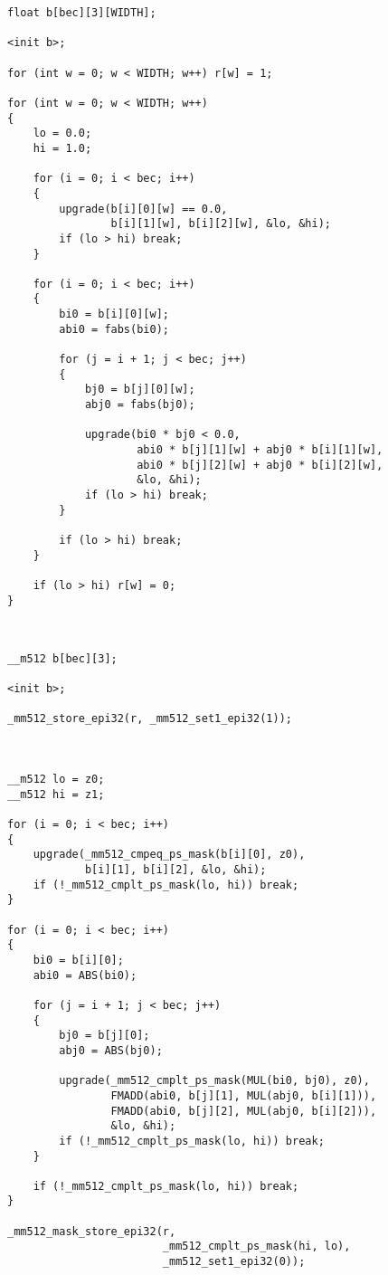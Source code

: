 \documentclass[
11pt,%
tightenlines,%
twoside,%
onecolumn,%
nofloats,%
nobibnotes,%
nofootinbib,%
superscriptaddress,%
noshowpacs,%
centertags]%
{revtex4}
\begin{document}
\begin{lstlisting}[caption={Scheme of program code before conversion to vector form.},label={lst:prac_inter_pred}]
float b[bec][3][WIDTH];

<init b>;

for (int w = 0; w < WIDTH; w++) r[w] = 1;

for (int w = 0; w < WIDTH; w++)
{
    lo = 0.0;
    hi = 1.0;

    for (i = 0; i < bec; i++)
    {
        upgrade(b[i][0][w] == 0.0,
                b[i][1][w], b[i][2][w], &lo, &hi);
        if (lo > hi) break;
    }

    for (i = 0; i < bec; i++)
    {
        bi0 = b[i][0][w];
        abi0 = fabs(bi0);

        for (j = i + 1; j < bec; j++)
        {
            bj0 = b[j][0][w];
            abj0 = fabs(bj0);

            upgrade(bi0 * bj0 < 0.0,
                    abi0 * b[j][1][w] + abj0 * b[i][1][w],
                    abi0 * b[j][2][w] + abj0 * b[i][2][w],
                    &lo, &hi);
            if (lo > hi) break;
        }

        if (lo > hi) break;
    }

    if (lo > hi) r[w] = 0;
}
\end{lstlisting}

\ \\

\begin{lstlisting}[caption={Vector form of the resulting code from listing \ref{lst:prac_inter_pred}.},label={lst:prac_inter_vec}]
__m512 b[bec][3];

<init b>;

_mm512_store_epi32(r, _mm512_set1_epi32(1));



__m512 lo = z0;
__m512 hi = z1;

for (i = 0; i < bec; i++)
{
    upgrade(_mm512_cmpeq_ps_mask(b[i][0], z0),
            b[i][1], b[i][2], &lo, &hi);
    if (!_mm512_cmplt_ps_mask(lo, hi)) break;
}

for (i = 0; i < bec; i++)
{
    bi0 = b[i][0];
    abi0 = ABS(bi0);

    for (j = i + 1; j < bec; j++)
    {
        bj0 = b[j][0];
        abj0 = ABS(bj0);

        upgrade(_mm512_cmplt_ps_mask(MUL(bi0, bj0), z0),
                FMADD(abi0, b[j][1], MUL(abj0, b[i][1])),
                FMADD(abi0, b[j][2], MUL(abj0, b[i][2])),
                &lo, &hi);
        if (!_mm512_cmplt_ps_mask(lo, hi)) break;
    }

    if (!_mm512_cmplt_ps_mask(lo, hi)) break;
}

_mm512_mask_store_epi32(r,
                        _mm512_cmplt_ps_mask(hi, lo),
                        _mm512_set1_epi32(0));
\end{lstlisting}
\end{document}
